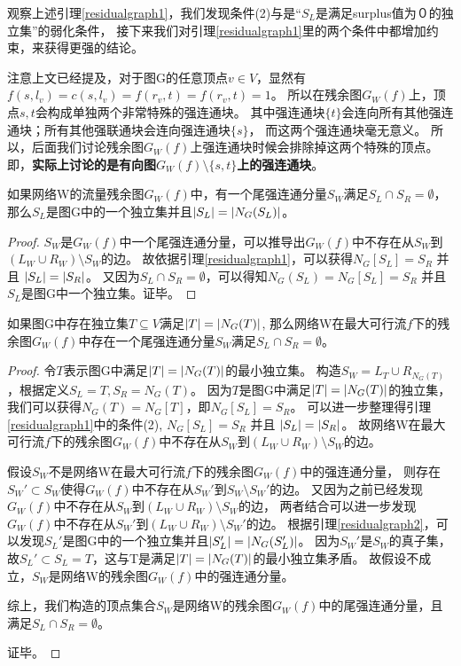 观察上述引理\ref{residualgraph1}，我们发现条件(2)与是“$S_L$是满足surplus值为０的独立集”的弱化条件，
接下来我们对引理\ref{residualgraph1}里的两个条件中都增加约束，来获得更强的结论。

注意上文已经提及，对于图G的任意顶点$v \in V$，显然有$f(s, l_v) = c(s, l_v) = f(r_v, t) = f(r_v, t) = 1$。
所以在残余图$G_W(f)$上，顶点$s,t$会构成单独两个非常特殊的强连通块。
其中强连通块$\{t\}$会连向所有其他强连通块；所有其他强联通块会连向强连通块$\{s\}$，
而这两个强连通块毫无意义。
所以，后面我们讨论残余图$G_W(f)$上强连通块时候会排除掉这两个特殊的顶点。
即，\textbf{实际上讨论的是有向图$G_W(f) \setminus \{s, t\}$上的强连通块}。


\begin{lemma} \label{residualgraph2}
如果网络W的流量残余图$G_W(f)$中，有一个尾强连通分量$S_W$满足$S_L \cap S_R = \emptyset$，
那么$S_L$是图G中的一个独立集并且$\left\vert S_L \right\vert = \left\vert N_G(S_L) \right\vert$。
\end{lemma}
\begin{proof}
$S_W$是$G_W(f)$中一个尾强连通分量，可以推导出$G_W(f)$中不存在从$S_W$到$(L_W \cup R_W) \setminus S_W$的边。
故依据引理\ref{residualgraph1}，可以获得$N_G[S_L] = S_R$ 并且 $\left\vert S_L \right\vert = \left\vert S_R \right\vert$。
又因为$S_L \cap S_R = \emptyset$，可以得知$N_G(S_L) = N_G[S_L] = S_R$ 并且 $S_L$是图G中一个独立集。证毕。
\end{proof}

\begin{lemma} \label{residualgraph3}
如果图G中存在独立集$T \subseteq V$满足$\left\vert T \right\vert = \left\vert N_G(T) \right\vert$,
那么网络W在最大可行流$f$下的残余图$G_W(f)$中存在一个尾强连通分量$S_W$满足$S_L \cap S_R = \emptyset$。
\end{lemma}
\begin{proof}
令$T$表示图G中满足$\left\vert T \right\vert = \left\vert N_G(T) \right\vert$的最小独立集。
构造$S_W = L_T \cup R_{N_G(T)}$，根据定义$S_L = T, S_R = N_G(T)$。
因为$T$是图G中满足$\left\vert T \right\vert = \left\vert N_G(T) \right\vert$的独立集，
我们可以获得$N_G(T) = N_G[T]$，即$N_G[S_L] = S_R$。
可以进一步整理得引理\ref{residualgraph1}中的条件(2), $N_G[S_L] = S_R$ 并且 $\left\vert S_L \right\vert = \left\vert S_R \right\vert$。
故网络W在最大可行流$f$下的残余图$G_W(f)$中不存在从$S_W$到$(L_W \cup R_W) \setminus S_W$的边。

假设$S_W$不是网络W在最大可行流$f$下的残余图$G_W(f)$中的强连通分量，
则存在$S_W' \subset S_W$使得$G_W(f)$中不存在从$S_W'$到$S_W \setminus S_W'$的边。
又因为之前已经发现$G_W(f)$中不存在从$S_W$到$(L_W \cup R_W) \setminus S_W$的边，
两者结合可以进一步发现$G_W(f)$中不存在从$S_W'$到$(L_W \cup R_W) \setminus S_W'$的边。
根据引理\ref{residualgraph2}，可以发现$S_L'$是图G中的一个独立集并且$\left\vert S_L' \right\vert = \left\vert N_G(S_L') \right\vert$。
因为$S_W'$是$S_W$的真子集，故$S_L' \subset S_L = T$，这与T是满足$\left\vert T \right\vert = \left\vert N_G(T) \right\vert$的最小独立集矛盾。
故假设不成立，$S_W$是网络W的残余图$G_W(f)$中的强连通分量。

综上，我们构造的顶点集合$S_W$是网络W的残余图$G_W(f)$中的尾强连通分量，且满足$S_L \cap S_R = \emptyset$。

证毕。
\end{proof}

